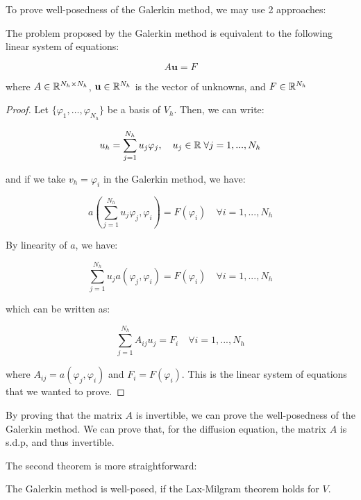 To prove well-posedness of the Galerkin method, we may use 2 approaches:

\begin{ftheorem}[Approach 1]
    The problem proposed by the Galerkin method is equivalent to the following linear system of equations:

    $$A \mathbf{u} = F$$

    where $A \in \mathbb{R}^{N_h \times N_h}$, $\mathbf{u} \in \mathbb{R}^{N_h}$ is the vector of unknowns, and $F \in \mathbb{R}^{N_h}$
\end{ftheorem}

\begin{proof}
    Let $\{ \varphi_1, \ldots, \varphi_{N_h} \}$ be a basis of $V_h$. Then, we can write:

    $$u_h = \sum_{j = 1}^{N_h} u_j \varphi_j, \quad u_j \in \mathbb{R} \; \forall j = 1, ..., N_h$$

    and if we take $v_h = \varphi_i$ in the Galerkin method, we have:

    $$a\left( \sum_{j = 1}^{N_h} u_j \varphi_j, \varphi_i \right) = F(\varphi_i) \quad \forall i = 1, ..., N_h$$

    By linearity of $a$, we have:

    $$\sum_{j = 1}^{N_h} u_j a(\varphi_j, \varphi_i) = F(\varphi_i) \quad \forall i = 1, ..., N_h$$

    which can be written as:

    $$\sum_{j = 1}^{N_h} A_{ij} u_j = F_i \quad \forall i = 1, ..., N_h$$

    where $A_{ij} = a(\varphi_j, \varphi_i)$ and $F_i = F(\varphi_i)$. This is the linear system of equations
    that we wanted to prove.

\end{proof}

\begin{fremark}
    By proving that the matrix $A$ is invertible, we can prove the well-posedness of the Galerkin method.
    We can prove that, for the diffusion equation, the matrix $A$ is s.d.p, and thus invertible.
\end{fremark}

\vspace{1em}

The second theorem is more straightforward:

\begin{ftheorem}[Approach 2]
    The Galerkin method is well-posed, if the Lax-Milgram theorem holds for $V$.
\end{ftheorem}

